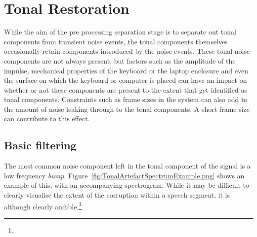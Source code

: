 %

\section{Tonal Restoration}
While the aim of the pre processing separation stage is to separate out tonal components from transient noise events, the tonal components themselves occasionally retain components introduced by the noise events. These tonal noise components are not always present, but factors such as the amplitude of the impulse, mechanical properties of the keyboard or the laptop enclosure and even the surface on which the keyboard or computer is placed can have an impact on whether or not these components are present to the extent that get identified as tonal components. Constraints such as frame sizes in the system can also add to the amount of noise leaking through to the tonal components. A short frame size can contribute to this effect.

\subsection{Basic filtering}\label{sec:TonalFiltering}
The most common noise component left in the tonal component of the signal is a low frequency \emph{bump}. Figure~\ref{fig:TonalArtefactSpectrumExample.png} shows an example of this, with an accompanying spectrogram. While it may be difficult to clearly visualise the extent of the corruption within a speech segment, it is although clearly audible.\footnote{}

